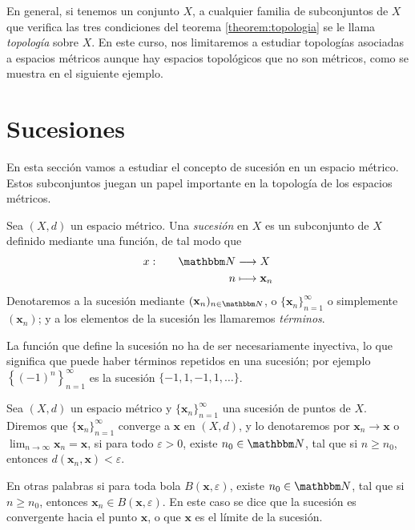 En general, si tenemos un conjunto $X$, a cualquier familia de subconjuntos de $X$ que verifica las tres condiciones del teorema \ref{theorem:topologia} se le llama \emph{topología} sobre $X$. En este curso, nos limitaremos a estudiar topologías asociadas a espacios métricos aunque hay espacios topológicos que no son métricos, como se muestra en el siguiente ejemplo.

\newpage

\section{Sucesiones}

En esta sección vamos a estudiar el concepto de sucesión en un espacio métrico. Estos subconjuntos juegan un papel importante en la topología de los espacios métricos.

\begin{definicion}{}{}
    Sea $(X, d)$ un espacio métrico. Una \emph{sucesión} en $X$ es un subconjunto de $X$ definido mediante una función, de tal modo que
    \begin{alignat*}{2}
        x &: & \quad \NN & \longrightarrow X \\
        & & n & \longmapsto \mathbf{x}_n
    \end{alignat*}
    Denotaremos a la sucesión mediante $(\mathbf{x}_n)_{n \in \NN}$, o $\{\mathbf{x}_n\}_{n = 1}^{\infty}$ o simplemente $(\mathbf{x}_n)$; y a los elementos de la sucesión les llamaremos \emph{términos}.
\end{definicion}

La función que define la sucesión no ha de ser necesariamente inyectiva, lo que significa que puede haber términos repetidos en una sucesión; por ejemplo $\left\{(-1)^n\right\}_{n = 1}^{\infty}$ es la sucesión $\{-1, 1, -1, 1, \dots \}$.

\begin{definicion}{}{}
    Sea $(X, d)$ un espacio métrico y $\{\mathbf{x}_n\}_{n = 1}^{\infty}$ una sucesión de puntos de $X$. Diremos que $\{\mathbf{x}_n\}_{n = 1}^{\infty}$ converge a $\mathbf{x}$ en $(X, d)$, y lo denotaremos por $\mathbf{x}_n \to \mathbf{x}$ o $\displaystyle \lim_{n \to \infty} \mathbf{x}_n = \mathbf{x}$, si para todo $\varepsilon > 0$, existe $n_0 \in \NN$, tal que si $n \geq n_0$, entonces $d(\mathbf{x}_n, \mathbf{x}) < \varepsilon$.
\end{definicion}

En otras palabras si para toda bola $B(\mathbf{x}, \varepsilon)$, existe $n_0 \in \NN$, tal que si $n \geq n_0$, entonces $\mathbf{x}_n \in B(\mathbf{x}, \varepsilon)$. En este caso se dice que la sucesión es convergente hacia el punto $\mathbf{x}$, o que $\mathbf{x}$ es el límite de la sucesión.

